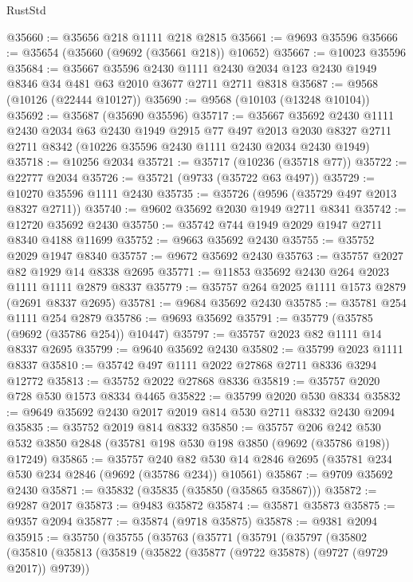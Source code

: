 \begin{lexlean}{RustStd}
\begin{coremodule}
{\begin{coremodule}
{{{{{{{{{{{{{{{{{{{{{{{{{{{{{{{{{{{{{{{{{{{{{{{{{{{{{{{@35660 := @35656 @218 @1111 @218 @2815
@35661 := @9693 @35596
@35666 := @35654 (@35660 (@9692 (@35661 @218)) @10652)
@35667 := @10023 @35596
@35684 := @35667
    @35596
    @2430
    @1111
    @2430
    @2034
    @123
    @2430
    @1949
    @8346
    @34
    @481
    @63
    @2010
    @3677
    @2711
    @2711
    @8318
@35687 := @9568 (@10126 (@22444 @10127))
@35690 := @9568 (@10103 (@13248 @10104))
@35692 := @35687 (@35690 @35596)
@35717 := @35667
    @35692
    @2430
    @1111
    @2430
    @2034
    @63
    @2430
    @1949
    @2915
    @77
    @497
    @2013
    @2030
    @8327
    @2711
    @2711
    @8342
    (@10226 @35596 @2430 @1111 @2430 @2034 @2430 @1949)
@35718 := @10256 @2034
@35721 := @35717 (@10236 (@35718 @77))
@35722 := @22777 @2034
@35726 := @35721 (@9733 (@35722 @63 @497))
@35729 := @10270 @35596 @1111 @2430
@35735 := @35726 (@9596 (@35729 @497 @2013 @8327 @2711))
@35740 := @9602 @35692 @2030 @1949 @2711 @8341
@35742 := @12720 @35692 @2430
@35750 := @35742 @744 @1949 @2029 @1947 @2711 @8340 @4188 @11699
@35752 := @9663 @35692 @2430
@35755 := @35752 @2029 @1947 @8340
@35757 := @9672 @35692 @2430
@35763 := @35757 @2027 @82 @1929 @14 @8338 @2695
@35771 := @11853 @35692 @2430 @264 @2023 @1111 @1111 @2879 @8337
@35779 := @35757 @264 @2025 @1111 @1573 @2879 (@2691 @8337 @2695)
@35781 := @9684 @35692 @2430
@35785 := @35781 @254 @1111 @254 @2879
@35786 := @9693 @35692
@35791 := @35779 (@35785 (@9692 (@35786 @254)) @10447)
@35797 := @35757 @2023 @82 @1111 @14 @8337 @2695
@35799 := @9640 @35692 @2430
@35802 := @35799 @2023 @1111 @8337
@35810 := @35742 @497 @1111 @2022 @27868 @2711 @8336 @3294 @12772
@35813 := @35752 @2022 @27868 @8336
@35819 := @35757 @2020 @728 @530 @1573 @8334 @4465
@35822 := @35799 @2020 @530 @8334
@35832 := @9649 @35692 @2430 @2017 @2019 @814 @530 @2711 @8332 @2430 @2094
@35835 := @35752 @2019 @814 @8332
@35850 := @35757
    @206
    @242
    @530
    @532
    @3850
    @2848
    (@35781 @198 @530 @198 @3850 (@9692 (@35786 @198)) @17249)
@35865 := @35757
    @240
    @82
    @530
    @14
    @2846
    @2695
    (@35781 @234 @530 @234 @2846 (@9692 (@35786 @234)) @10561)
@35867 := @9709 @35692 @2430
@35871 := @35832 (@35835 (@35850 (@35865 @35867)))
@35872 := @9287 @2017
@35873 := @9483 @35872
@35874 := @35871 @35873
@35875 := @9357 @2094
@35877 := @35874 (@9718 @35875)
@35878 := @9381 @2094
@35915 := @35750
    (@35755
      (@35763
        (@35771
          (@35791
            (@35797
              (@35802
                (@35810
                  (@35813
                    (@35819
                      (@35822 (@35877 (@9722 @35878) (@9727 (@9729 @2017)) @9739))
}}}}}}}}}}}}}}}}}}}}}}}}}}}}}}}}}}}}}}}}}}}}}}}}}}}}}}}
\end{coremodule}}
\end{coremodule}
\end{lexlean}

